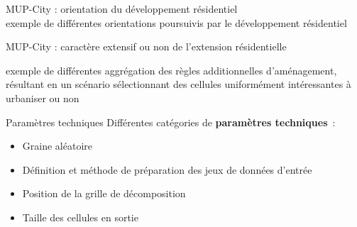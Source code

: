 \documentclass[xcolor=table]{beamer}
\begin{document}

\begin{frame}{MUP-City : orientation du développement résidentiel}
\vspace{1cm}
\\
{\footnotesize exemple de différentes orientations poursuivis par le développement résidentiel}
\end{frame}


\begin{frame}{MUP-City : caractère extensif ou non de l'extension résidentielle}
\vspace{1cm}

{\footnotesize exemple de différentes aggrégation des règles additionnelles d'aménagement, résultant en un scénario sélectionnant des cellules uniformément intéressantes à urbaniser ou non}
\end{frame}

\begin{frame}{Paramètres techniques}
	Différentes catégories de \textbf{paramètres techniques}~:\\
	\begin{itemize}
		\item Graine aléatoire
		\item Définition et méthode de préparation des jeux de données d'entrée
		\item Position de la grille de décomposition
		\item Taille des cellules en sortie
	\end{itemize}
\end{frame}
\end{document}
